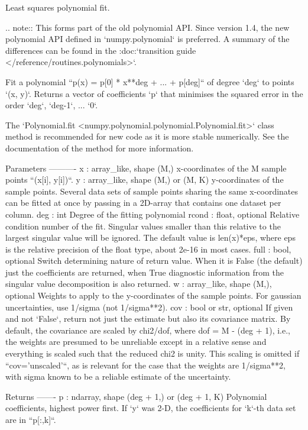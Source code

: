\begin{DoxyVerb}Least squares polynomial fit.

.. note::
   This forms part of the old polynomial API. Since version 1.4, the
   new polynomial API defined in `numpy.polynomial` is preferred.
   A summary of the differences can be found in the
   :doc:`transition guide </reference/routines.polynomials>`.

Fit a polynomial ``p(x) = p[0] * x**deg + ... + p[deg]`` of degree `deg`
to points `(x, y)`. Returns a vector of coefficients `p` that minimises
the squared error in the order `deg`, `deg-1`, ... `0`.

The `Polynomial.fit <numpy.polynomial.polynomial.Polynomial.fit>` class
method is recommended for new code as it is more stable numerically. See
the documentation of the method for more information.

Parameters
----------
x : array_like, shape (M,)
    x-coordinates of the M sample points ``(x[i], y[i])``.
y : array_like, shape (M,) or (M, K)
    y-coordinates of the sample points. Several data sets of sample
    points sharing the same x-coordinates can be fitted at once by
    passing in a 2D-array that contains one dataset per column.
deg : int
    Degree of the fitting polynomial
rcond : float, optional
    Relative condition number of the fit. Singular values smaller than
    this relative to the largest singular value will be ignored. The
    default value is len(x)*eps, where eps is the relative precision of
    the float type, about 2e-16 in most cases.
full : bool, optional
    Switch determining nature of return value. When it is False (the
    default) just the coefficients are returned, when True diagnostic
    information from the singular value decomposition is also returned.
w : array_like, shape (M,), optional
    Weights to apply to the y-coordinates of the sample points. For
    gaussian uncertainties, use 1/sigma (not 1/sigma**2).
cov : bool or str, optional
    If given and not `False`, return not just the estimate but also its
    covariance matrix. By default, the covariance are scaled by
    chi2/dof, where dof = M - (deg + 1), i.e., the weights are presumed 
    to be unreliable except in a relative sense and everything is scaled 
    such that the reduced chi2 is unity. This scaling is omitted if 
    ``cov='unscaled'``, as is relevant for the case that the weights are 
    1/sigma**2, with sigma known to be a reliable estimate of the 
    uncertainty.

Returns
-------
p : ndarray, shape (deg + 1,) or (deg + 1, K)
    Polynomial coefficients, highest power first.  If `y` was 2-D, the
    coefficients for `k`-th data set are in ``p[:,k]``.


\end{DoxyVerb}
